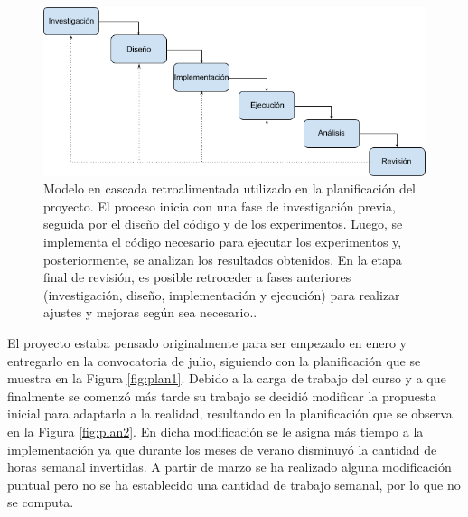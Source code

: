 \begin{figure}
    \centering
    \includegraphics[width=1.06\linewidth]{Plantilla_TFG_latex//imagenes//Inf//Int/workflow.png}
    \caption[Planificación de la parte Informática del presente TFG en modelo de cascada retroalimentada]{Modelo en cascada retroalimentada utilizado en la planificación del proyecto. El proceso inicia con una fase de investigación previa, seguida por el diseño del código y de los experimentos. Luego, se implementa el código necesario para ejecutar los experimentos y, posteriormente, se analizan los resultados obtenidos. En la etapa final de revisión, es posible retroceder a fases anteriores (investigación, diseño, implementación y ejecución) para realizar ajustes y mejoras según sea necesario..}
    \label{fig:modcas}
\end{figure}









El proyecto estaba pensado originalmente para ser empezado en enero y entregarlo en la convocatoria de julio, siguiendo con la planificación que se muestra en la Figura \ref{fig:plan1}. Debido a la carga de trabajo del curso y a que finalmente se comenzó más tarde su trabajo se decidió modificar la propuesta inicial para adaptarla a la realidad, resultando en la planificación que se observa en la Figura \ref{fig:plan2}. En dicha modificación se le asigna más tiempo a la implementación ya que durante los meses de verano disminuyó la cantidad de horas semanal invertidas. A partir de marzo se ha realizado alguna modificación puntual pero no se ha establecido una cantidad de trabajo semanal, por lo que no se computa.


